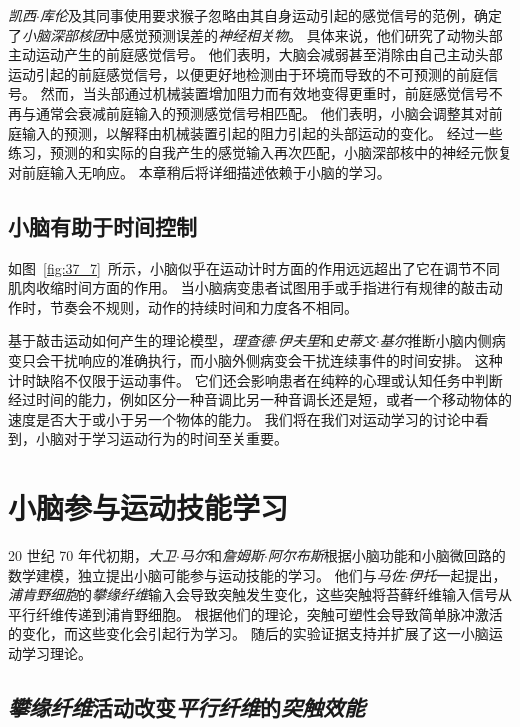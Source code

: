 \textit{凯西$\cdot$库伦}及其同事使用要求猴子忽略由其自身运动引起的感觉信号的范例，确定了\textit{小脑深部核团}中感觉预测误差的\textit{神经相关物}。
具体来说，他们研究了动物头部主动运动产生的前庭感觉信号。
他们表明，大脑会减弱甚至消除由自己主动头部运动引起的前庭感觉信号，以便更好地检测由于环境而导致的不可预测的前庭信号。
然而，当头部通过机械装置增加阻力而有效地变得更重时，前庭感觉信号不再与通常会衰减前庭输入的预测感觉信号相匹配。
他们表明，小脑会调整其对前庭输入的预测，以解释由机械装置引起的阻力引起的头部运动的变化。
经过一些练习，预测的和实际的自我产生的感觉输入再次匹配，小脑深部核中的神经元恢复对前庭输入无响应。
本章稍后将详细描述依赖于小脑的学习。



\subsection{小脑有助于时间控制}

如图~\ref{fig:37_7}~所示，小脑似乎在运动计时方面的作用远远超出了它在调节不同肌肉收缩时间方面的作用。
当小脑病变患者试图用手或手指进行有规律的敲击动作时，节奏会不规则，动作的持续时间和力度各不相同。


基于敲击运动如何产生的理论模型，\textit{理查德$\cdot$伊夫里}和\textit{史蒂文$\cdot$基尔}推断小脑内侧病变只会干扰响应的准确执行，而小脑外侧病变会干扰连续事件的时间安排。
这种计时缺陷不仅限于运动事件。
它们还会影响患者在纯粹的心理或认知任务中判断经过时间的能力，例如区分一种音调比另一种音调长还是短，或者一个移动物体的速度是否大于或小于另一个物体的能力。
我们将在我们对运动学习的讨论中看到，小脑对于学习运动行为的时间至关重要。



\section{小脑参与运动技能学习}

20 世纪 70 年代初期，\textit{大卫$\cdot$马尔}和\textit{詹姆斯$\cdot$阿尔布斯}根据小脑功能和小脑微回路的数学建模，独立提出小脑可能参与运动技能的学习。
他们与\textit{马佐$\cdot$伊托}一起提出，\textit{浦肯野细胞}的\textit{攀缘纤维}输入会导致突触发生变化，这些突触将苔藓纤维输入信号从平行纤维传递到浦肯野细胞。
根据他们的理论，突触可塑性会导致简单脉冲激活的变化，而这些变化会引起行为学习。
随后的实验证据支持并扩展了这一小脑运动学习理论。



\subsection{\textit{攀缘纤维}活动改变\textit{平行纤维}的\textit{突触效能}}

